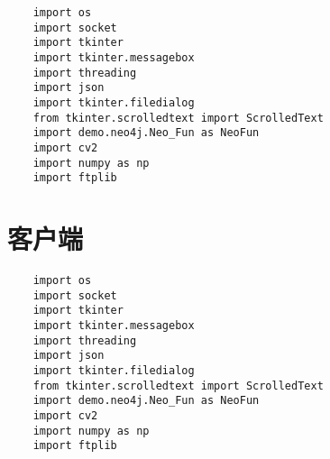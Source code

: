\documentclass[forprint]{OSPaper}
\begin{document}
\begin{lstlisting}
	import os
	import socket
	import tkinter
	import tkinter.messagebox
	import threading
	import json
	import tkinter.filedialog
	from tkinter.scrolledtext import ScrolledText
	import demo.neo4j.Neo_Fun as NeoFun
	import cv2
	import numpy as np
	import ftplib
\end{lstlisting}

\section{客户端}
\begin{lstlisting}
	import os
	import socket
	import tkinter
	import tkinter.messagebox
	import threading
	import json
	import tkinter.filedialog
	from tkinter.scrolledtext import ScrolledText
	import demo.neo4j.Neo_Fun as NeoFun
	import cv2
	import numpy as np
	import ftplib
\end{lstlisting}
\end{document}
